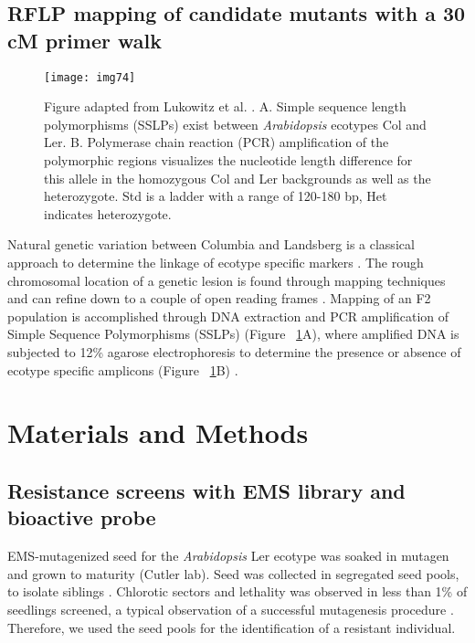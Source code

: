 \subsection{RFLP mapping of candidate mutants with a 30 cM primer walk}

\begin{figure}
\texttt{[image: img74]}
\caption{Figure adapted from Lukowitz et al. \cite{lukowitz2000positional}. A. Simple sequence length polymorphisms (SSLPs) exist between {\it Arabidopsis} ecotypes Col and Ler. B. Polymerase chain reaction (PCR) amplification of the polymorphic regions visualizes the nucleotide length difference for this allele in the homozygous Col and Ler backgrounds as well as the heterozygote. Std is a ladder with a range of 120-180 bp, Het indicates heterozygote.}
\label{fig:Lukowitz}
\end{figure}

Natural genetic variation between Columbia and Landsberg is a classical approach to determine the linkage of ecotype specific markers \cite{lukowitz2000positional}. The rough chromosomal location of a genetic lesion is found through mapping techniques and can refine down to a couple of open reading frames \cite{Art_of_Arabidopsis_Screens}. Mapping of an F2 population is accomplished through DNA extraction and PCR amplification of Simple Sequence Polymorphisms (SSLPs) (Figure ~\ref{fig:Lukowitz}A), where amplified DNA is subjected to 12{\%} agarose electrophoresis to determine the presence or absence of ecotype specific amplicons (Figure ~\ref{fig:Lukowitz}B) \cite{lukowitz2000positional}.

\section{Materials and Methods}


\subsection{Resistance screens with EMS library and bioactive probe}

EMS-mutagenized seed for the {\it Arabidopsis} Ler ecotype was soaked in mutagen and grown to maturity \cite{EMS_Arabidopsis}(Cutler lab). Seed was collected in segregated seed pools, to isolate siblings \cite{lightner199814seed}. Chlorotic sectors and lethality was observed in less than 1{\%} of seedlings screened, a typical observation of a successful mutagenesis procedure \cite{lightner199814seed}. Therefore, we used the seed pools for the identification of a resistant individual.

